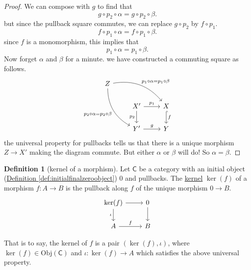 \documentclass[a4paper]{report}
\newcommand{\defn}[1]{\ul{#1}}
\newcommand{\Obj}{\mathrm{Obj}}
\theoremstyle{definition}
\newtheorem{definition}{Definition}[section]
\theoremstyle{plain}
\theoremstyle{remark}
\begin{document}
\begin{proof}
  We can compose with $g$ to find that 
  \begin{equation*}
    g \circ p_{2} \circ \alpha = g \circ p_{2} \circ \beta.
  \end{equation*}
  but since the pullback square commutes, we can replace $g \circ p_{2}$ by $f \circ p_{1}$.
  \begin{equation*}
    f \circ p_{1} \circ \alpha = f \circ p_{1} \circ \beta.
  \end{equation*}
  since $f$ is a monomorphism, this implies that 
  \begin{equation*}
    p_{1} \circ \alpha = p_{1} \circ \beta.
  \end{equation*}
  Now forget $\alpha$ and $\beta$ for a minute. we have constructed a commuting square as follows.
  \begin{equation*}
    \begin{tikzcd}
      Z
      \arrow[drr, bend left, "p_{1} \circ \alpha = p_{1} \circ \beta"]
      \arrow[ddr, swap, bend right, "p_{2} \circ \alpha = p_{2} \circ \beta"]
      \\
      & X'
      \arrow[r, "p_{1}"]
      \arrow[d, swap, "p_{2}"]
      & X
      \arrow[d, hookrightarrow, "f"]
      \\
      & Y'
      \arrow[r, "g"]
      & Y
    \end{tikzcd}
  \end{equation*}
  the universal property for pullbacks tells us that there is a unique morphism $Z \to X'$ making the diagram commute. But either $\alpha$ or $\beta$ will do! So $\alpha = \beta$.
\end{proof}

\begin{definition}[kernel of a morphism]
  \label{def:kernelofmorphism}
  Let $\mathsf{C}$ be a category with an initial object (\hyperref[def:initialfinalzeroobject]{Definition \ref*{def:initialfinalzeroobject}}) $0$ and pullbacks. The \defn{kernel} $\ker(f)$ of a morphism $f\colon A \to B$ is the pullback along $f$ of the unique morphism $0 \to B$.
  \begin{equation*}
    \begin{tikzcd}
      \ker(f) \arrow[d, swap, "\iota"] \arrow[r] & 0 \arrow[d] \\
      A \arrow[r, "f"] & B
    \end{tikzcd}
  \end{equation*}

  That is to say, the kernel of $f$ is a pair $(\ker(f), \iota)$, where $\ker(f) \in \Obj(\mathsf{C})$ and $\iota\colon \ker(f) \to A$ which satisfies the above universal property.
\end{definition}
\end{document}
